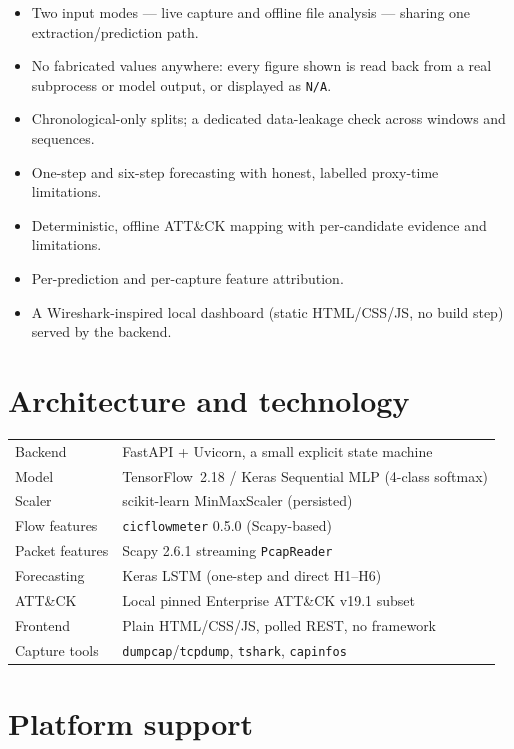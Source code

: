 \documentclass[11pt,a4paper]{article}
\begin{document}
\begin{itemize}
  \item Two input modes --- live capture and offline file analysis --- sharing
  one extraction/prediction path.
  \item No fabricated values anywhere: every figure shown is read back from a
  real subprocess or model output, or displayed as \texttt{N/A}.
  \item Chronological-only splits; a dedicated data-leakage check across
  windows and sequences.
  \item One-step and six-step forecasting with honest, labelled proxy-time
  limitations.
  \item Deterministic, offline ATT\&CK mapping with per-candidate evidence and
  limitations.
  \item Per-prediction and per-capture feature attribution.
  \item A Wireshark-inspired local dashboard (static HTML/CSS/JS, no build
  step) served by the backend.
\end{itemize}

\section{Architecture and technology}

\begin{tabular}{@{}ll@{}}
  \toprule
  Backend        & FastAPI + Uvicorn, a small explicit state machine \\
  Model          & TensorFlow~2.18 / Keras Sequential MLP (4-class softmax) \\
  Scaler         & scikit-learn MinMaxScaler (persisted) \\
  Flow features  & \texttt{cicflowmeter} 0.5.0 (Scapy-based) \\
  Packet features& Scapy 2.6.1 streaming \texttt{PcapReader} \\
  Forecasting    & Keras LSTM (one-step and direct H1--H6) \\
  ATT\&CK        & Local pinned Enterprise ATT\&CK v19.1 subset \\
  Frontend       & Plain HTML/CSS/JS, polled REST, no framework \\
  Capture tools  & \texttt{dumpcap}/\texttt{tcpdump}, \texttt{tshark},
                   \texttt{capinfos} \\
  \bottomrule
\end{tabular}

\section{Platform support}
\end{document}
